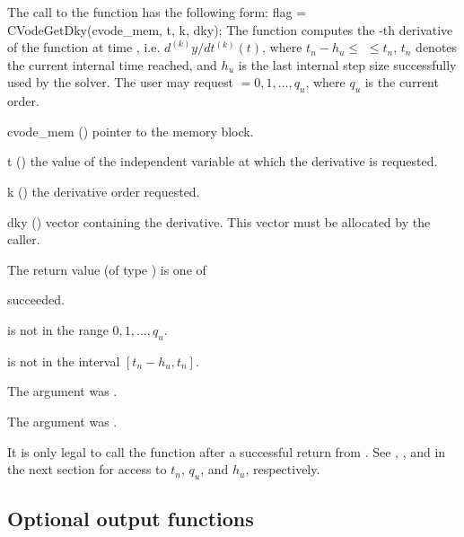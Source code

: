 The call to the  function has the following form:
{
  flag = CVodeGetDky(cvode\_mem, t, k, dky);
}
{
  The function  computes the -th derivative of the 
  function at time , i.e. $d^{(k)}y/dt^{(k)} (t)$, where $t_n - h_u \le$
   $\le t_n$, $t_n$ denotes the current internal time reached, and $h_u$
  is the  last internal step size successfully used by the solver.  The user 
  may request  $= 0, 1, \ldots, q_u$, where $q_u$ is the current order. 
}
{
  \begin{args}
  \item[cvode\_mem] ()
    pointer to the {\cvode} memory block.
  \item[t] () the value of the independent variable at
    which the derivative is requested.
  \item[k] () the derivative order requested.
  \item[dky] ()
    vector containing the derivative.
    This vector must be allocated by the caller. 
  \end{args}
}
{
  The return value  (of type ) is one of
  \begin{args} 
  \item[\Id{CV\_SUCCESS}]
     succeeded.
  \item[\Id{CV\_BAD\_K}] 
     is not in the range $0, 1, ..., q_u$.
  \item[\Id{CV\_BAD\_T}] 
     is not in the interval $[t_n - h_u , t_n]$.
  \item[\Id{CV\_BAD\_DKY}] 
    The  argument was .
  \item[\Id{CV\_MEM\_NULL}] 
    The  argument was .
  \end{args}

}
{
  It is only legal to call the function  after a 
  successful return from . See ,
  , and  in the next section for
  access to $t_n$, $q_u$, and $h_u$, respectively.
}

\subsection{Optional output functions}\label{ss:optional_output}

